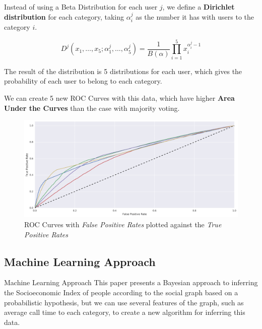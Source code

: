 \documentclass{beamer}
\newcommand{\Beta}{B}
\begin{document}
\begin{frame}
	Instead of using a Beta Distribution for each user \( j \), we define a \textbf{Dirichlet distribution} for each category, taking \( \alpha^j_i \) as the number it has with users to the category \( i \).

	\[
		D^j \left( x_1, \ldots, x_5; \alpha^j_1, \ldots, \alpha^j_5 \right) = \frac{1}{\Beta(\alpha)} \prod^5_{i = 1}{x_i^{\alpha^j_i - 1}}
	\]

	\pause{}

	The result of the distribution is 5 distributions for each user, which gives the probability of each user to belong to each category.
\end{frame}

\begin{frame}
	We can create 5 new ROC Curves with this data, which have higher \textbf{Area Under the Curves} than the case with majority voting.

	\begin{figure}
		\includegraphics[height=.6\textheight]{ROC_multiclass_wide.png}
		\caption{ROC Curves with \textit{False Positive Rates} plotted against the \textit{True Positive Rates}}
	\end{figure}
\end{frame}

\subsection{Machine Learning Approach}
\begin{frame}{Machine Learning Approach}
	This paper presents a Bayesian approach to inferring the Socioeconomic Index of people according to the social graph based on a probabilistic hypothesis, but we can use several features of the graph, such as average call time to each category, to create a new algorithm for inferring this data.
\end{frame}
\end{document}
